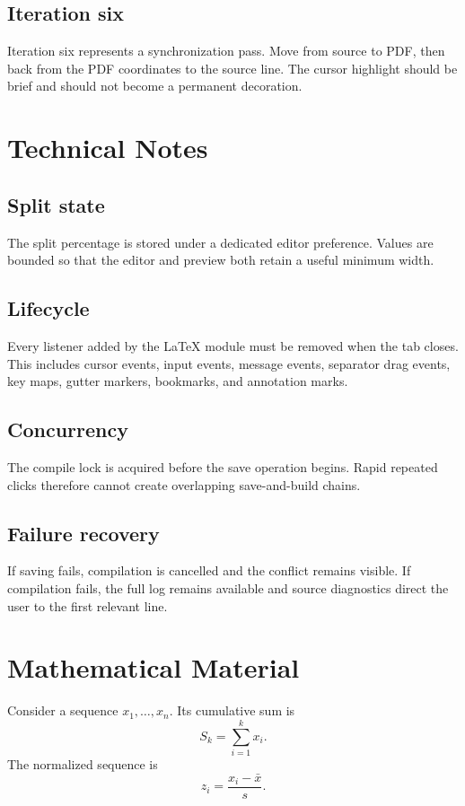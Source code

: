 \documentclass[12pt]{report}
\begin{document}
\section{Iteration six}
Iteration six represents a synchronization pass. Move from source to PDF, then
back from the PDF coordinates to the source line. The cursor highlight should be
brief and should not become a permanent decoration.

\chapter{Technical Notes}
\section{Split state}
The split percentage is stored under a dedicated editor preference. Values are
bounded so that the editor and preview both retain a useful minimum width.

\section{Lifecycle}
Every listener added by the LaTeX module must be removed when the tab closes.
This includes cursor events, input events, message events, separator drag events,
key maps, gutter markers, bookmarks, and annotation marks.

\section{Concurrency}
The compile lock is acquired before the save operation begins. Rapid repeated
clicks therefore cannot create overlapping save-and-build chains.

\section{Failure recovery}
If saving fails, compilation is cancelled and the conflict remains visible. If
compilation fails, the full log remains available and source diagnostics direct
the user to the first relevant line.

\chapter{Mathematical Material}
Consider a sequence $x_1,\ldots,x_n$. Its cumulative sum is
\begin{equation}
  S_k = \sum_{i=1}^{k}x_i.
\end{equation}
The normalized sequence is
\begin{equation}
  z_i = \frac{x_i-\bar{x}}{s}.
\end{equation}
\end{document}
